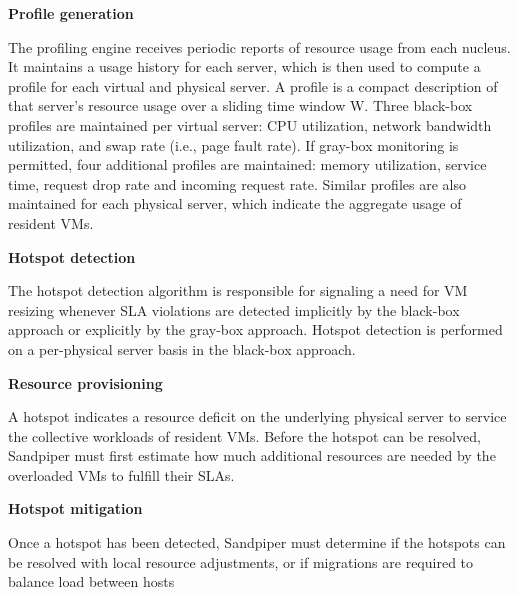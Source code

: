 \documentclass[conference]{IEEEtran}
\begin{document}
\textbf{Profile generation} 



The profiling engine receives periodic reports of resource
usage from each nucleus. It maintains a usage history
for each server, which is then used to compute a
profile for each virtual and physical server. A profile is a
compact description of that server’s resource usage over
a sliding time window W. Three black-box profiles are
maintained per virtual server: CPU utilization, network
bandwidth utilization, and swap rate (i.e., page fault rate).
If gray-box monitoring is permitted, four additional profiles
are maintained: memory utilization, service time, request
drop rate and incoming request rate. Similar
profiles are also maintained for each physical server, which
indicate the aggregate usage of resident VMs.


\textbf{Hotspot detection}




The hotspot detection algorithm is responsible for signaling
a need for VM resizing whenever SLA violations
are detected implicitly by the black-box approach or
explicitly by the gray-box approach. Hotspot detection is
performed on a per-physical server basis in the black-box
approach.



\textbf{Resource provisioning}



A hotspot indicates a resource deficit on the underlying
physical server to service the collective workloads of resident
VMs. Before the hotspot can be resolved, Sandpiper must first estimate how much additional resources are
needed by the overloaded VMs to fulfill their SLAs.




\textbf{Hotspot mitigation}



Once a hotspot has been detected, Sandpiper must
determine if the hotspots can be resolved with local resource
adjustments, or if migrations are required to balance
load between hosts 



%
%
\end{document}
